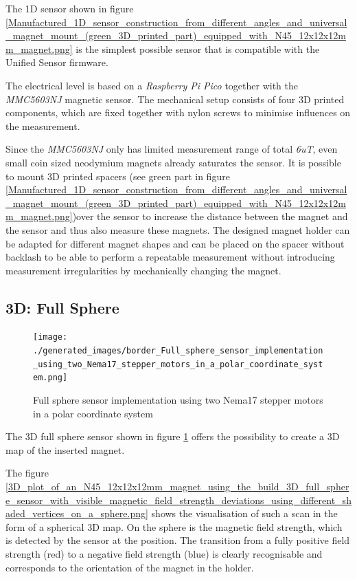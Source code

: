 The 1D sensor shown in figure
\ref{Manufactured_1D_sensor_construction_from_different_angles_and_universal_magnet_mount_(green_3D_printed_part)_equipped_with_N45_12x12x12mm_magnet.png}
is the simplest possible sensor that is compatible with the Unified
Sensor firmware.

The electrical level is based on a \emph{Raspberry Pi Pico} together
with the \emph{MMC5603NJ} magnetic sensor. The mechanical setup consists
of four 3D printed components, which are fixed together with nylon
screws to minimise influences on the measurement.

\newpage

Since the \emph{MMC5603NJ} only has limited measurement range of total
\emph{6uT}, even small coin sized neodymium magnets already saturates
the sensor. It is possible to mount 3D printed spacers (see green part
in figure
\ref{Manufactured_1D_sensor_construction_from_different_angles_and_universal_magnet_mount_(green_3D_printed_part)_equipped_with_N45_12x12x12mm_magnet.png})over
the sensor to increase the distance between the magnet and the sensor
and thus also measure these magnets. The designed magnet holder can be
adapted for different magnet shapes and can be placed on the spacer
without backlash to be able to perform a repeatable measurement without
introducing measurement irregularities by mechanically changing the
magnet.

\hypertarget{d-full-sphere}{%
\subsection{3D: Full Sphere}\label{d-full-sphere}}

\begin{figure}
\centering
\texttt{[image: ./generated\_images/border\_Full\_sphere\_sensor\_implementation\_using\_two\_Nema17\_stepper\_motors\_in\_a\_polar\_coordinate\_system.png]}
\caption{Full sphere sensor implementation using two Nema17 stepper
motors in a polar coordinate system
\label{Full_sphere_sensor_implementation_using_two_Nema17_stepper_motors_in_a_polar_coordinate_system.png}}
\end{figure}

The 3D full sphere sensor shown in figure
\ref{Full_sphere_sensor_implementation_using_two_Nema17_stepper_motors_in_a_polar_coordinate_system.png}
offers the possibility to create a 3D map of the inserted magnet.

The figure
\ref{3D_plot_of_an_N45_12x12x12mm_magnet_using_the_build_3D_full_sphere_sensor_with_visible_magnetic_field_strength_deviations_using_different_shaded_vertices_on_a_sphere.png}
shows the visualisation of such a scan in the form of a spherical 3D
map. On the sphere is the magnetic field strength, which is detected by
the sensor at the position. The transition from a fully positive field
strength (red) to a negative field strength (blue) is clearly
recognisable and corresponds to the orientation of the magnet in the
holder.

